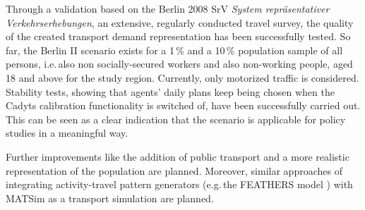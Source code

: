 Through a validation based on the Berlin 2008 SrV \textit{System repräsentativer Verkehrserhebungen}, an extensive, regularly conducted travel survey, the quality of the created transport demand representation has been successfully tested. So far, the Berlin II scenario exists for a 1\,\%{} and a 10\,\%{} population sample of all persons, i.e.\,also non socially-secured workers and also non-working people, aged 18 and above for the study region. Currently, only motorized traffic is considered. Stability tests, showing that agents' daily plans keep being chosen when the Cadyts calibration functionality is switched of, have been successfully carried out. This can be seen as a clear indication that the scenario is applicable for policy studies in a meaningful way.

Further improvements like the addition of public transport and a more realistic representation of the population are planned. Moreover, similar approaches of integrating activity-travel pattern generators (e.g.\,the FEATHERS model \citep[][]{ArentzeEtAl_TRBTDF_2006}) with MATSim as a transport simulation are planned.

%
%

